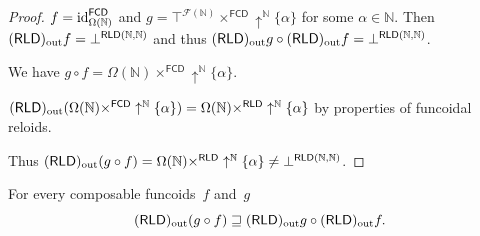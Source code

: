 \begin{proof}
$f={\operatorname{id}}_{\Omega(\mathbb{N})}^{\mathsf{FCD}}$ and $g=\top^{\mathscr{F}(\mathbb{N})}\times^{\mathsf{FCD}}\uparrow^{\mathbb{N}}\{\alpha\}$
for some $\alpha\in\mathbb{N}$. Then $(\mathsf{RLD})_{\mathrm{out}} f=\bot^{\mathsf{RLD}(\mathbb{N},\mathbb{N})}$
and thus $(\mathsf{RLD})_{\mathrm{out}} g\circ(\mathsf{RLD})_{\mathrm{out}} f=\bot^{\mathsf{RLD}(\mathbb{N},\mathbb{N})}$.

We have $g\circ f=\Omega(\mathbb{N})\times^{\mathsf{FCD}}\uparrow^{\mathbb{N}}\{\alpha\}$.

$(\mathsf{RLD})_{\mathrm{out}}(\Omega(\mathbb{N})\times^{\mathsf{FCD}}\uparrow^{\mathbb{N}}\{\alpha\})=\Omega(\mathbb{N})\times^{\mathsf{RLD}}\uparrow^{\mathbb{N}}\{\alpha\}$
by properties of funcoidal reloids.




Thus $(\mathsf{RLD})_{\mathrm{out}}(g\circ f)=\Omega(\mathbb{N})\times^{\mathsf{RLD}}\uparrow^{\mathbb{N}}\{\alpha\}\ne\bot^{\mathsf{RLD}(\mathbb{N},\mathbb{N})}$.\end{proof}
\begin{conjecture}
For every composable funcoids~$f$ and~$g$
\[
(\mathsf{RLD})_{\mathrm{out}}(g\circ f)\sqsupseteq(\mathsf{RLD})_{\mathrm{out}} g\circ(\mathsf{RLD})_{\mathrm{out}} f.
\]
\end{conjecture}

